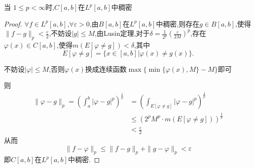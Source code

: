 \documentclass[lang=cn,18pt]{elegantbook}
\begin{document}
\begin{theorem}
    当 $1 \leqslant p < \infty$时,$C[a,b]$在$L^p[a,b]$中稠密
\end{theorem}
\begin{proof}
    $\forall f \in L^p[a,b]$,$\forall \varepsilon >0$,由$B[a,b]$在$L^p[a,b]$中稠密,则存在$g \in B[a,b]$,使得$\|f-g\|_p < \frac{\varepsilon}{2}$,不妨设$|g| \leqslant M$,由Lusin定理,对于$\delta=\frac{1}{2^p}\left(\frac{\varepsilon}{2M}\right)^p$,存在$\varphi(x) \in C[a,b]$,使得$m(E[\varphi \not= g]) < \delta$,其中$$E[\varphi \not= g]=\{x \in [a,b]|\varphi(x) \not= g(x)\}.$$

    不妨设$|\varphi| \leqslant M$,否则$\varphi(x)$换成连续函数$\max \{\min\{\varphi(x),M\}-M\}$即可

    则
    \begin{align*}
        \|\varphi -g\|_p=\left(\int_{a}^{b}|\varphi-g|^p\right)^{\frac{1}{p}}& = \left(\int_{E[\varphi \not=g]}|\varphi-g|^p\right)^{\frac{1}{p}} \\
        & \leqslant \left(2^p M^p\cdot m(E[\varphi \not= g]) \right)^{\frac{1}{p}} \\
        & < \frac{\varepsilon}{2}
    \end{align*}
    从而
    $$\|f-\varphi\|_p \leqslant \|f-g\|_p + \|g-\varphi\|_p < \varepsilon$$即$C[a,b]$在$L^p[a,b]$中稠密.
\end{proof}
\end{document}
